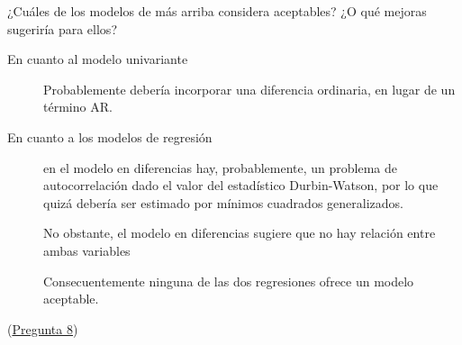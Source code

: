 \documentclass[10pt]{article}
\begin{document}
¿Cuáles de los modelos de más arriba considera aceptables? ¿O qué
mejoras sugeriría para ellos?

\begin{description}
\item[{En cuanto al modelo univariante}] Probablemente debería incorporar
una diferencia ordinaria, en lugar de un término AR.

\item[{En cuanto a los modelos de regresión}] en el modelo en diferencias
hay, probablemente, un problema de autocorrelación dado el valor del
estadístico Durbin-Watson, por lo que quizá debería ser estimado por
mínimos cuadrados generalizados.

No obstante, el modelo en diferencias sugiere que no hay relación
entre ambas variables

Consecuentemente ninguna de las dos regresiones ofrece un modelo
aceptable.
\end{description}

(\hyperref[sec:org6bb2298]{Pregunta 8})
\end{document}
